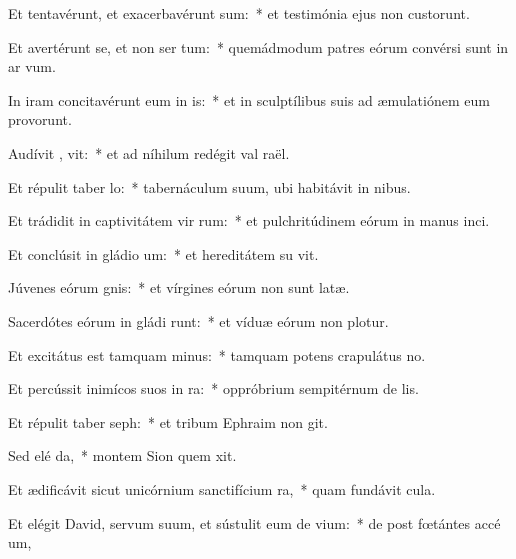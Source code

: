\item Et tentavérunt, et exacerbavérunt  sum:~* et testimónia ejus non custorunt.
\item Et avertérunt se, et non ser tum:~* quemádmodum patres eórum convérsi sunt in ar vum.
\item In iram concitavérunt eum in  is:~* et in sculptílibus suis ad æmulatiónem eum provorunt.
\item Audívit ,  vit:~* et ad níhilum redégit val raël.
\item Et répulit taber lo:~* tabernáculum suum, ubi habitávit in nibus.
\item Et trádidit in captivitátem vir rum:~* et pulchritúdinem eórum in manus inci.
\item Et conclúsit in gládio  um:~* et hereditátem su vit.
\item Júvenes eórum  gnis:~* et vírgines eórum non sunt latæ.
\item Sacerdótes eórum in gládi runt:~* et víduæ eórum non plotur.
\item Et excitátus est tamquam  minus:~* tamquam potens crapulátus  no.
\item Et percússit inimícos suos in ra:~* oppróbrium sempitérnum de lis.
\item Et répulit taber seph:~* et tribum Ephraim non git.
\item Sed elé  da,~* montem Sion quem xit.
\item Et ædificávit sicut unicórnium sanctifícium   ra,~* quam fundávit  cula.
\item Et elégit David, servum suum, et sústulit eum de  vium:~* de post fœtántes accé um,
